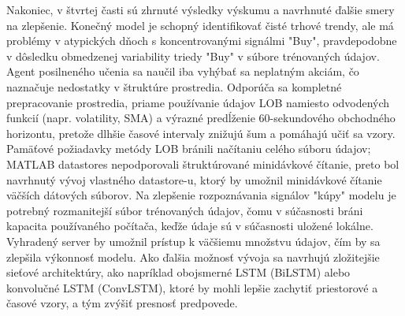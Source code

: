 \documentclass[a4paper,oneside,onecolumn,12pt]{book}
\begin{document}
Nakoniec, v štvrtej časti sú zhrnuté výsledky výskumu a navrhnuté ďalšie smery na zlepšenie. Konečný model je schopný identifikovať čisté trhové trendy, ale má problémy v atypických dňoch s koncentrovanými signálmi "Buy", pravdepodobne v dôsledku obmedzenej variability triedy "Buy" v súbore trénovaných údajov. Agent posilneného učenia sa naučil iba vyhýbať sa neplatným akciám, čo naznačuje nedostatky v štruktúre prostredia. Odporúča sa kompletné prepracovanie prostredia, priame používanie údajov LOB namiesto odvodených funkcií (napr. volatility, SMA) a výrazné predĺženie 60-sekundového obchodného horizontu, pretože dlhšie časové intervaly znižujú šum a pomáhajú učiť sa vzory. Pamäťové požiadavky metódy LOB bránili načítaniu celého súboru údajov; MATLAB datastores nepodporovali štruktúrované minidávkové čítanie, preto bol navrhnutý vývoj vlastného datastore-u, ktorý by umožnil minidávkové čítanie väčších dátových súborov. Na zlepšenie rozpoznávania signálov "kúpy" modelu je potrebný rozmanitejší súbor trénovaných údajov, čomu v súčasnosti bráni kapacita používaného počítača, keďže údaje sú v súčasnosti uložené lokálne. Vyhradený server by umožnil prístup k väčšiemu množstvu údajov, čím by sa zlepšila výkonnosť modelu. Ako ďalšia možnosť vývoja sa navrhujú zložitejšie sieťové architektúry, ako napríklad obojsmerné LSTM (BiLSTM) alebo konvolučné LSTM (ConvLSTM), ktoré by mohli lepšie zachytiť priestorové a časové vzory, a tým zvýšiť presnosť predpovede.
\pagebreak

\begingroup
\renewcommand{\cleardoublepage}{}
\renewcommand{\clearpage}{}
\renewcommand{\pagebreak}{}
\printbibliography[title=References]
\end{document}
